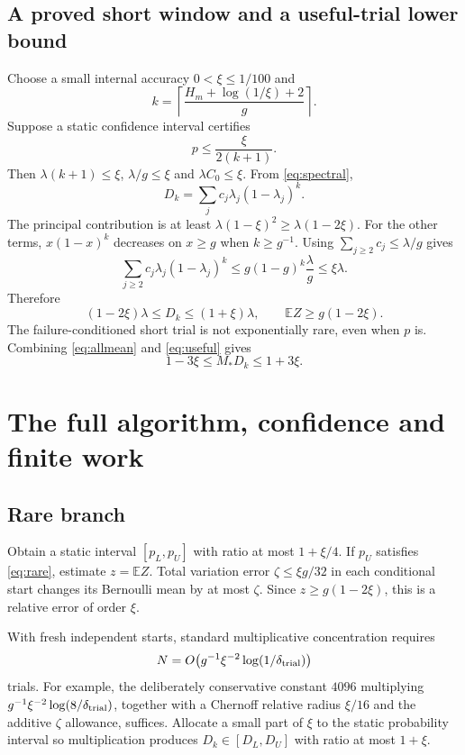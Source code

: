 \documentclass[11pt,a4paper]{article}
\newcommand{\E}{\mathbb E}
\begin{document}
\subsection{A proved short window and a useful-trial lower bound}
Choose a small internal accuracy $0<\xi\le1/100$ and
\begin{equation}
 k=\left\lceil\frac{H_m+\log(1/\xi)+2}{g}\right\rceil.\label{eq:k}
\end{equation}
Suppose a static confidence interval certifies
\begin{equation}
 p\le\frac{\xi}{2(k+1)}.\label{eq:rare}
\end{equation}
Then $\lambda(k+1)\le\xi$, $\lambda/g\le\xi$ and $\lambda C_0\le\xi$. From \eqref{eq:spectral},
\[
 D_k=\sum_j c_j\lambda_j(1-\lambda_j)^k.
\]
The principal contribution is at least $\lambda(1-\xi)^2\ge\lambda(1-2\xi)$. For the other terms, $x(1-x)^k$ decreases on $x\ge g$ when $k\ge g^{-1}$. Using $\sum_{j\ge2}c_j\le\lambda/g$ gives
\[
 \sum_{j\ge2}c_j\lambda_j(1-\lambda_j)^k
 \le g(1-g)^k\frac\lambda g\le\xi\lambda.
\]
Therefore
\begin{equation}
 (1-2\xi)\lambda\le D_k\le(1+\xi)\lambda,
 \qquad \boxed{\E Z\ge g(1-2\xi).}\label{eq:useful}
\end{equation}
The failure-conditioned short trial is not exponentially rare, even when $p$ is. Combining \eqref{eq:allmean} and \eqref{eq:useful} gives
\begin{equation}
 1-3\xi\le M_*D_k\le1+3\xi.\label{eq:productbound}
\end{equation}

\section{The full algorithm, confidence and finite work}
\subsection{Rare branch}
Obtain a static interval $[p_L,p_U]$ with ratio at most $1+\xi/4$. If $p_U$ satisfies \eqref{eq:rare}, estimate $z=\E Z$. Total variation error $\zeta\le\xi g/32$ in each conditional start changes its Bernoulli mean by at most $\zeta$. Since $z\ge g(1-2\xi)$, this is a relative error of order $\xi$.

With fresh independent starts, standard multiplicative concentration requires
\begin{equation}
 N=O\!\left(g^{-1}\xi^{-2}\log(1/\delta_{\rm trial})\right)\label{eq:N}
\end{equation}
trials. For example, the deliberately conservative constant $4096$ multiplying $g^{-1}\xi^{-2}\log(8/\delta_{\rm trial})$, together with a Chernoff relative radius $\xi/16$ and the additive $\zeta$ allowance, suffices. Allocate a small part of $\xi$ to the static probability interval so multiplication produces $D_k\in[D_L,D_U]$ with ratio at most $1+\xi$.
\end{document}
